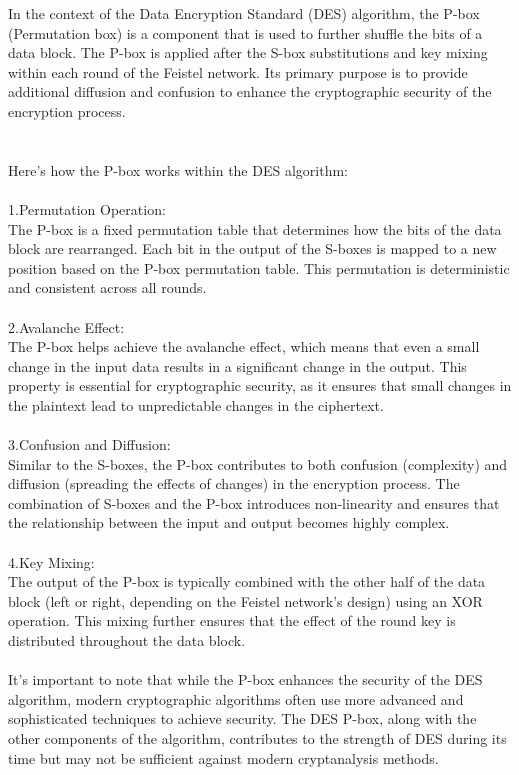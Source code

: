 \documentclass{report}
\begin{document}
In the context of the Data Encryption Standard (DES) algorithm, the P-box (Permutation box) is a component that is used to further shuffle the bits of a data block. The P-box is applied after the S-box substitutions and key mixing within each round of the Feistel network. Its primary purpose is to provide additional diffusion and confusion to enhance the cryptographic security of the encryption process.\\
\\
\\
Here's how the P-box works within the DES algorithm:\\
\\
1.Permutation Operation:\\
 The P-box is a fixed permutation table that determines how the bits of the data block are rearranged. Each bit in the output of the S-boxes is mapped to a new position based on the P-box permutation table. This permutation is deterministic and consistent across all rounds.\\
\\
2.Avalanche Effect:\\
 The P-box helps achieve the avalanche effect, which means that even a small change in the input data results in a significant change in the output. This property is essential for cryptographic security, as it ensures that small changes in the plaintext lead to unpredictable changes in the ciphertext.\\
\\
3.Confusion and Diffusion:\\
 Similar to the S-boxes, the P-box contributes to both confusion (complexity) and diffusion (spreading the effects of changes) in the encryption process. The combination of S-boxes and the P-box introduces non-linearity and ensures that the relationship between the input and output becomes highly complex.\\
\\
4.Key Mixing:\\
 The output of the P-box is typically combined with the other half of the data block (left or right, depending on the Feistel network's design) using an XOR operation. This mixing further ensures that the effect of the round key is distributed throughout the data block.\\
\\
It's important to note that while the P-box enhances the security of the DES algorithm, modern cryptographic algorithms often use more advanced and sophisticated techniques to achieve security. The DES P-box, along with the other components of the algorithm, contributes to the strength of DES during its time but may not be sufficient against modern cryptanalysis methods.\\
\end{document}

